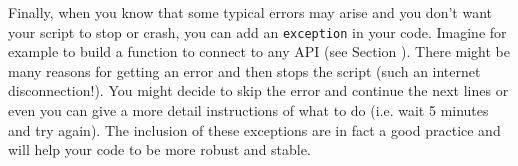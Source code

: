 Finally, when you know that some typical errors may arise and you don't want your script to stop or crash, you can add an \texttt{exception} in your code. Imagine for example to build a function to connect to any API (see Section ). There might be many reasons for getting an error and then stops the script (such an internet disconnection!). You might decide to skip  the error and continue the next lines or even you can give a more detail instructions of what to do (i.e. wait 5 minutes and try again). The inclusion of these exceptions are in fact a good practice and will help your code to be more robust and stable.